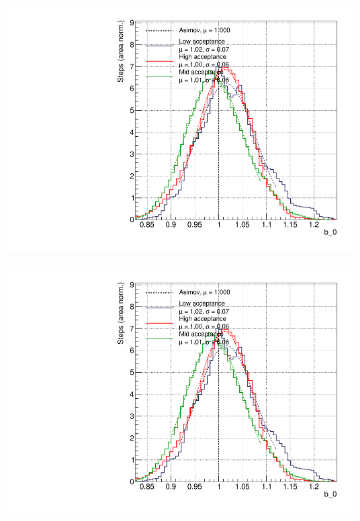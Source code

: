 \begin{figure}[h]
	\begin{subfigure}[t]{0.32\textwidth}
		\includegraphics[width=\textwidth, trim={0mm 0mm 0mm 0mm}, clip,page=132]{figures/mach3/Asimov/2017_NewDet_Asimov_actually_0_2017b_NewDet_3Xsec_4Det_5Flux_NewXSecTune_Asimov_0_2017b_NewDet_NewData_Asimov_Long_0}
	\end{subfigure}
\begin{subfigure}[t]{0.32\textwidth}
	\includegraphics[width=\textwidth, trim={0mm 0mm 0mm 0mm}, clip,page=133]{figures/mach3/Asimov/2017_NewDet_Asimov_actually_0_2017b_NewDet_3Xsec_4Det_5Flux_NewXSecTune_Asimov_0_2017b_NewDet_NewData_Asimov_Long_0}
\end{subfigure}
\begin{subfigure}[t]{0.32\textwidth}

\end{subfigure}
\end{figure}
